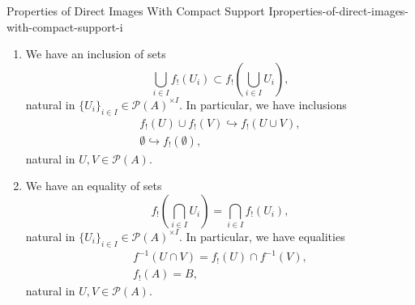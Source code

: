 \begin{proposition}{Properties of Direct Images With Compact Support I}{properties-of-direct-images-with-compact-support-i}
\begin{enumerate}
\begin{enumerate}
                    \begin{enumerate}%
                        \item We have $f_{*}(U)\subset V$.
                        \item We have $U\subset f^{-1}(V)$.
                    \end{enumerate}%
                \item The following conditions are equivalent:
                    \begin{enumerate}%
                        \item We have $f^{-1}(U)\subset V$.
                        \item We have $U\subset f_{!}(V)$.
                    \end{enumerate}%
            \end{enumerate}%
        \item\label{properties-of-direct-images-with-compact-support-i-lax-preservation-of-colimits}We have an inclusion of sets
            \[
                \bigcup_{i\in I}f_{!}(U_{i})%
                \subset%
                f_{!}(\bigcup_{i\in I}U_{i}),%
            \]%
            natural in $\{U_{i}\}_{i\in I}\in\mathcal{P}(A)^{\times I}$. In particular, we have inclusions%
            \[
                \begin{gathered}
                    f_{!}(U)\cup f_{!}(V) \hookrightarrow f_{!}(U\cup V),\\
                    \emptyset             \hookrightarrow f_{!}(\emptyset),
                \end{gathered}
            \]%
            natural in $U,V\in\mathcal{P}(A)$.
        \item\label{properties-of-direct-images-with-compact-support-i-preservation-of-limits}We have an equality of sets
            \[
                f_{!}(\bigcap_{i\in I}U_{i})%
                =%
                \bigcap_{i\in I}f_{!}(U_{i}),%
            \]%
            natural in $\{U_{i}\}_{i\in I}\in\mathcal{P}(A)^{\times I}$. In particular, we have equalities%
            \[
                \begin{gathered}
                    f^{-1}(U\cap V) = f_{!}(U)\cap f^{-1}(V),\\
                    f_{!}(A)        = B,
                \end{gathered}
            \]%
            natural in $U,V\in\mathcal{P}(A)$.

\end{enumerate}
\end{proposition}

